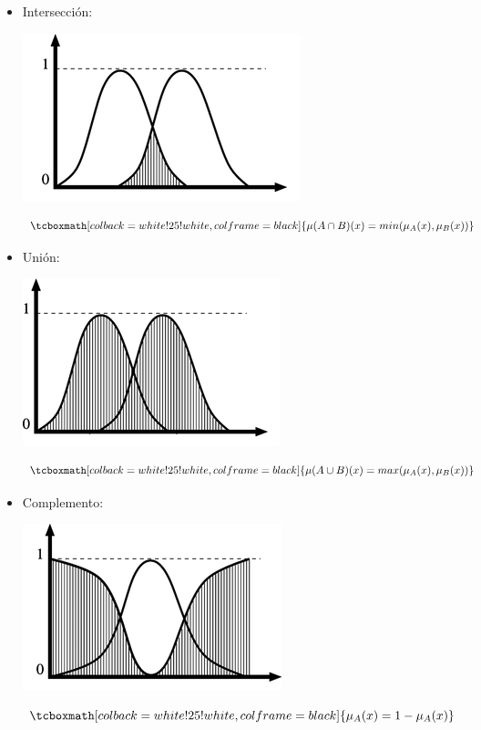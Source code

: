 \begin{itemize}
    \item Intersección:  \hfill 
    \begin{center}
        \includegraphics[scale=0.6]{Tesis/Capitulos/02_MARCO_TEORICO/img/interseccion.png}
    \end{center}
    \begin{equation}
    \tcboxmath[colback=white!25!white,colframe=black]
    {\mu( A \cap B ) (x) = min (\mu_A (x), \mu_B (x) )}  
    \end{equation}
    
    \item Unión:  \hfill 
    \begin{center}
        \includegraphics[scale=0.6]{Tesis/Capitulos/02_MARCO_TEORICO/img/union.png}
    \end{center}
    \begin{equation}
    \tcboxmath[colback=white!25!white,colframe=black]
    {\mu( A \cup B ) (x) = max (\mu_A (x), \mu_B (x) )}  
    \end{equation}
    
    \item Complemento:  \hfill 
    \begin{center}
        \includegraphics[scale=0.6]{Tesis/Capitulos/02_MARCO_TEORICO/img/complemento.png}
    \end{center}
    \begin{equation}
    \tcboxmath[colback=white!25!white,colframe=black]
    {\mu_A (x) = 1 - \mu_A (x)}  
    \end{equation}
    

\end{itemize}
